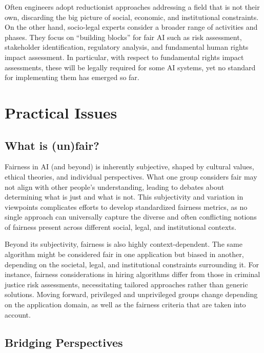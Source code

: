 \documentclass[12pt,a4paper,openright,twoside]{book}
\begin{document}
Often engineers adopt reductionist approaches addressing a field that is not their own, discarding the big picture of social, economic, and institutional constraints.
%
On the other hand, socio-legal experts consider a broader range of activities and phases.
%
They focus on ``building blocks'' for fair \ac{AI} such as risk assessment, stakeholder identification, regulatory analysis, and fundamental human rights impact assessment.
%
In particular, with respect to fundamental rights impact assessments, these will be legally required for some \ac{AI} systems, yet no standard for implementing them has emerged so far.




\section{Practical Issues}

\subsection{What is (un)fair?}


Fairness in \ac{AI} (and beyond) is inherently subjective, shaped by cultural values, ethical theories, and individual perspectives.
%
What one group considers fair may not align with other people’s understanding, leading to debates about determining what is just and what is not.
%
This subjectivity and variation in viewpoints complicates efforts to develop standardized fairness metrics, as no single approach can universally capture the diverse and often conflicting notions of fairness present across different social, legal, and institutional contexts.


Beyond its subjectivity, fairness is also highly context-dependent. The same algorithm might be considered fair in one application but biased in another, depending on the societal, legal, and institutional constraints surrounding it.
%
For instance, fairness considerations in hiring algorithms differ from those in criminal justice risk assessments, necessitating tailored approaches rather than generic solutions.
%
Moving forward, privileged and unprivileged groups change depending on the application domain, as well as the fairness criteria that are taken into account.

\subsection{Bridging Perspectives}
\end{document}
